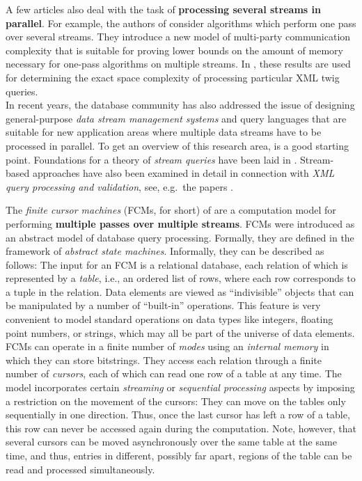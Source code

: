 \documentclass[proceedings]{stacs}
\theoremstyle{plain}\newtheorem{satz}[thm]{Satz}
\theoremstyle{definition}\newtheorem{crucial}[thm]{Crucial Definition}
\begin{document}
A few articles also deal with the task of \textbf{processing several streams in parallel}.
For example, the authors of \cite{Shalem-BarYossef-icde2008} consider 
algorithms which perform one pass over several streams.
They introduce a new model of multi-party communication complexity that is suitable for
proving lower bounds 
on the amount of memory necessary for one-pass algorithms on multiple
streams.
In \cite{Shalem-BarYossef-icde2008}, these results are used for determining 
the exact space complexity of processing particular XML twig queries.
\\
In recent years, the database community has also addressed the issue of 
designing general-purpose \emph{data stream management systems}
and query languages that are suitable for new application areas where multiple data streams
have to be processed in parallel. To get an overview of this research area, 
\cite{bbdmw02} is a good starting point. Foundations for a theory of \emph{stream queries}
have been laid in \cite{DBLP:conf/dbpl/GurevichLB07}.
Stream-based approaches have also
been examined in detail in connection with \emph{XML query processing and validation},
see, e.g.\ the papers \cite{SegoufinVianu_PODS02,SegoufinSirangelo_ICDT07,SuciuEtAl_TODS04,ChanFelberEtAl-VLDBJ2002,barfonjos04,barfonjos05,grokocschwe05a}.


The \emph{finite cursor machines} (FCMs, for short) of 
\cite{FCM-paper} are a computation model for performing
\textbf{multiple passes over multiple streams}.
FCMs were introduced as an abstract model of database query processing. 
Formally, they are defined in the framework of 
\emph{abstract state machines}.
Informally, they can be described as follows:
The input for an FCM is a relational database, each relation of which is 
represented by a \emph{table}, i.e., an ordered list of rows, where each 
row corresponds to a tuple in the relation.
Data elements are viewed as
``indivisible'' objects that can be manipulated by a number of ``built-in'' operations. 
This feature is very convenient to model standard operations on data types 
like integers, floating point numbers,
or strings, which may all be part of the universe of data elements.
FCMs can operate in a finite number of \emph{modes} using an 
\emph{internal memory} in which they can
store bitstrings. They access each relation through a finite number of 
\emph{cursors}, each of which can read one row of a table at any time.
The model incorporates certain \emph{streaming} or \emph{sequential processing} 
aspects by imposing a restriction on the movement of the cursors: 
They can move on the tables only sequentially in one direction. 
Thus, once the last cursor has left a row of a table, 
this row can never be accessed again during the computation.
Note, however, that several cursors can be moved asynchronously over the same table 
at the same time, and thus, entries in different, possibly far apart, 
regions of the table can be read and processed simultaneously.
\end{document}
